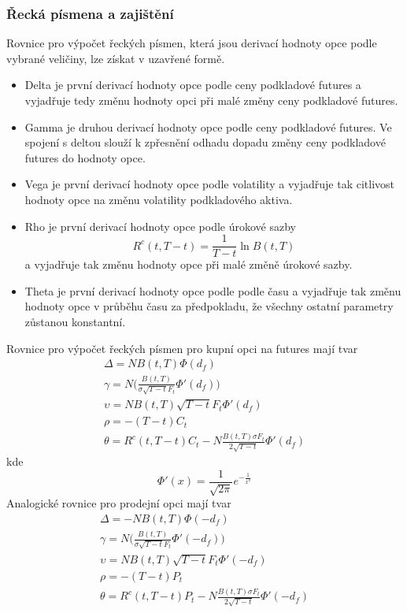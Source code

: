 \documentclass[a4paper]{book}
\begin{document}
\subsubsection{Řecká písmena a zajištění}

Rovnice pro výpočet řeckých písmen, která jsou derivací hodnoty opce podle vybrané veličiny, lze získat v uzavřené formě.
\begin{itemize}
\item Delta je první derivací hodnoty opce podle ceny podkladové futures a vyjadřuje tedy změnu hodnoty opci při malé změny ceny podkladové futures.
\item Gamma je druhou derivací hodnoty opce podle ceny podkladové futures. Ve spojení s deltou slouží k zpřesnění odhadu dopadu změny ceny podkladové futures do hodnoty opce.
\item Vega je první derivací hodnoty opce podle volatility a vyjadřuje tak citlivost hodnoty opce na změnu volatility podkladového aktiva.
\item Rho je první derivací hodnoty opce podle úrokové sazby
\begin{equation*}
R^c(t, T - t)= \frac{1}{T-t} \ln B(t,T)
\end{equation*}
a vyjadřuje tak změnu hodnoty opce při malé změně úrokové sazby.
\item Theta je první derivací hodnoty opce podle podle času a vyjadřuje tak změnu hodnoty opce v průběhu času za předpokladu, že všechny ostatní parametry zůstanou konstantní. 
\end{itemize}
Rovnice pro výpočet řeckých písmen pro kupní opci na futures mají tvar
\begin{gather*}
\Delta = N B(t,T) \Phi(d_f) \\
\gamma = N \Bigg( \frac{B(t,T)}{\sigma \sqrt{T-t}F_t}\Phi'(d_f) \Bigg) \\
\upsilon = N B(t,T)\sqrt{T-t}F_t \Phi'(d_f) \\
\rho = -(T-t)C_t \\
\theta = R^c(t,T-t)C_t - N \frac{B(t,T)\sigma F_t}{2 \sqrt{T-t}}\Phi'(d_f)
\end{gather*}
kde
\begin{equation*}
\Phi'(x) = \frac{1}{\sqrt{2 \pi}} e^{-\frac{1}{x^2}}
\end{equation*}
Analogické rovnice pro prodejní opci mají tvar
\begin{gather*}
\Delta = -N B(t,T) \Phi(-d_f) \\
\gamma = N \Bigg( \frac{B(t,T)}{\sigma \sqrt{T-t}F_t}\Phi'(-d_f) \Bigg) \\
\upsilon = N B(t,T)\sqrt{T-t}F_t \Phi'(-d_f) \\
\rho = -(T-t)P_t \\
\theta = R^c(t,T-t)P_t - N \frac{B(t,T)\sigma F_t}{2 \sqrt{T-t}}\Phi'(-d_f)
\end{gather*}
\end{document}
